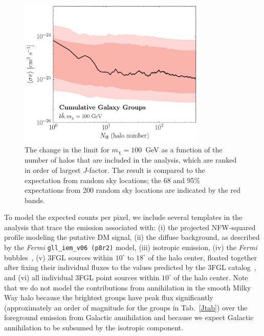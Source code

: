 \begin{figure}[t]
\centering
\includegraphics[width=0.8\textwidth]{ch-clusters/plots/elephant.pdf}
\caption{The change in the limit for $m_\chi = 100$~GeV as a function of the number of halos that are included in the analysis, which are ranked in order of largest $J$-factor.  The result is compared to the expectation from random sky locations; the 68 and 95\% expectations from 200 random sky locations are indicated by the red bands.}
\label{fig:bounds2}
\end{figure}


To model the expected counts per pixel, we include several templates in the analysis that trace the emission associated with: (i) the projected NFW-squared profile modeling the putative DM signal, (ii) the diffuse background, as described by the  {\it Fermi} \texttt{gll\_iem\_v06 (p8r2)} model, (iii) isotropic emission, (iv) the {\it Fermi} bubbles~\cite{Su:2010qj}, (v) 3FGL sources within $10^\circ$ to $18^\circ$ of the halo center, floated together after fixing their individual fluxes to the values predicted by the 3FGL catalog~\cite{Acero:2015hja}, and (vi) all individual 3FGL point sources within $10^{\circ}$ of the halo center.  Note that we do not model the contributions from annihilation in the smooth Milky Way halo because the brightest groups have peak flux significantly (approximately an order of magnitude for the groups in Tab.~\ref{Jtab}) over the foreground emission from Galactic annihilation and because we expect Galactic annihilation to be subsumed by the isotropic component.   

